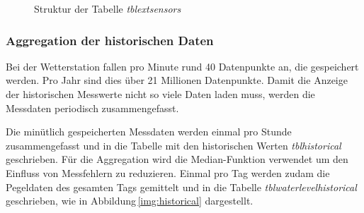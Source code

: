 \begin{figure}[htbp!]
	\centering
	\caption{Struktur der Tabelle \emph{tblextsensors}}
	\label{img:tabellenstruktur}
\end{figure}



\subsubsection{Aggregation der historischen Daten}
Bei der Wetterstation fallen pro Minute rund 40 Datenpunkte an, die gespeichert werden. Pro Jahr sind dies über 21 Millionen Datenpunkte. Damit die Anzeige der historischen Messwerte nicht so viele Daten laden muss, werden die Messdaten periodisch zusammengefasst.
\newline


\noindent
Die minütlich gespeicherten Messdaten werden einmal pro Stunde zusammengefasst und in die Tabelle mit den historischen Werten \emph{tblhistorical} geschrieben. Für die Aggregation wird die Median-Funktion verwendet um den Einfluss von Messfehlern zu reduzieren. Einmal pro Tag werden zudam die Pegeldaten des gesamten Tags gemittelt und in die Tabelle \emph{tblwaterlevelhistorical} geschrieben, wie in Abbildung\,\ref{img:historical} dargestellt.

